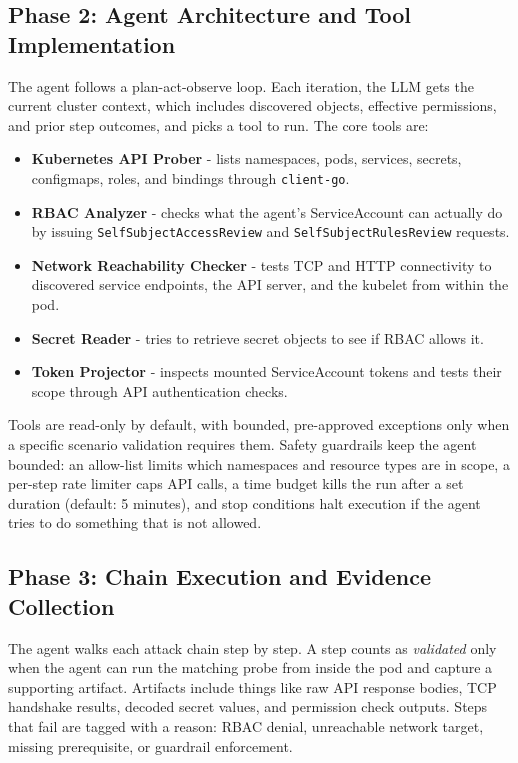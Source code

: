 \documentclass[conference]{IEEEtran}
\begin{document}
\subsection{Phase 2: Agent Architecture and Tool Implementation}
The agent follows a plan-act-observe loop. Each iteration, the LLM gets the current cluster context, which includes discovered objects, effective permissions, and prior step outcomes, and picks a tool to run. The core tools are:
\begin{itemize}
    \item \textbf{Kubernetes API Prober} - lists namespaces, pods, services, secrets, configmaps, roles, and bindings through \texttt{client-go}.
    \item \textbf{RBAC Analyzer} - checks what the agent's ServiceAccount can actually do by issuing \texttt{SelfSubjectAccessReview} and \texttt{SelfSubjectRulesReview} requests.
    \item \textbf{Network Reachability Checker} - tests TCP and HTTP connectivity to discovered service endpoints, the API server, and the kubelet from within the pod.
    \item \textbf{Secret Reader} - tries to retrieve secret objects to see if RBAC allows it.
    \item \textbf{Token Projector} - inspects mounted ServiceAccount tokens and tests their scope through API authentication checks.
\end{itemize}

Tools are read-only by default, with bounded, pre-approved exceptions only when a specific scenario validation requires them. Safety guardrails keep the agent bounded: an allow-list limits which namespaces and resource types are in scope, a per-step rate limiter caps API calls, a time budget kills the run after a set duration (default: 5 minutes), and stop conditions halt execution if the agent tries to do something that is not allowed.

\subsection{Phase 3: Chain Execution and Evidence Collection}
The agent walks each attack chain step by step. A step counts as \emph{validated} only when the agent can run the matching probe from inside the pod and capture a supporting artifact. Artifacts include things like raw API response bodies, TCP handshake results, decoded secret values, and permission check outputs. Steps that fail are tagged with a reason: RBAC denial, unreachable network target, missing prerequisite, or guardrail enforcement.
\end{document}

